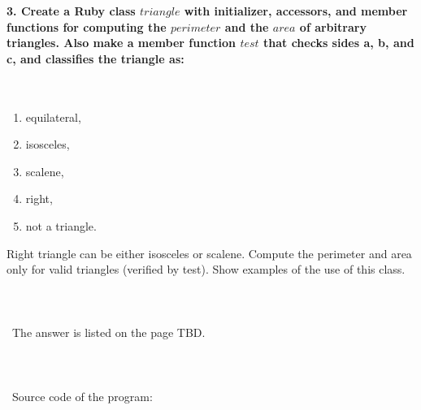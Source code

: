 \documentclass{article}
\begin{document}
\begin{verbatim} 

\end{verbatim}
	
\paragraph{}\
\paragraph{}\

\paragraph{3. Create a Ruby class \(triangle\) with initializer, accessors, and member functions for computing the \(perimeter\) and the \(area\) of arbitrary triangles. Also make a member function \(test\) that checks sides a, b, and c, and classifies the triangle as: }\

\begin{enumerate}[label=(\arabic*)]
	\item equilateral,
	\item isosceles,
	\item scalene,
	\item right,
	\item not a triangle.
\end{enumerate}

Right triangle can be either isosceles or scalene. Compute the perimeter and area only for valid triangles (verified by test). Show examples of the use of this class.

\paragraph{}\
\paragraph{}\
	The answer is listed on the page TBD.
\paragraph{}\
\paragraph{}\
Source code of the program:

\begin{verbatim}

\end{verbatim}
\end{document}
